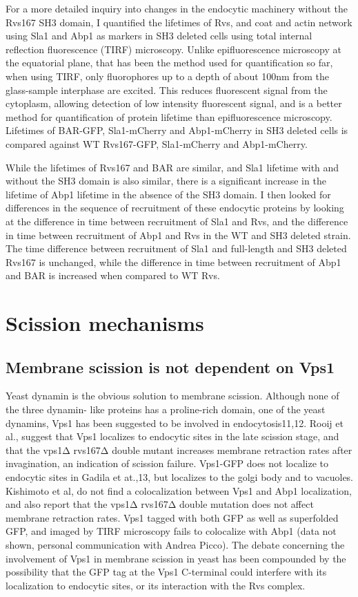 For a more detailed inquiry into changes in the endocytic machinery without the Rvs167 SH3 domain, I quantified the lifetimes of Rvs, and coat and actin network using Sla1 and Abp1 as markers in SH3 deleted cells using total internal reflection fluorescence (TIRF) microscopy. Unlike epifluorescence microscopy at the equatorial plane, that has been the method used for quantification so far, when using TIRF, only fluorophores up to a depth of about 100nm from the glass-sample interphase are excited. This reduces fluorescent signal from the cytoplasm, allowing detection of low intensity fluorescent signal, and is a better method for quantification of protein lifetime than epifluorescence microscopy. Lifetimes of BAR-GFP, Sla1-mCherry and Abp1-mCherry in SH3 deleted cells is compared against WT Rvs167-GFP, Sla1-mCherry and Abp1-mCherry. 

	
	\vspace{5mm}
While the lifetimes of Rvs167 and BAR are similar, and Sla1 lifetime with and without the SH3 domain is also similar, there is a significant increase in the lifetime of Abp1 lifetime in the absence of the SH3 domain. I then looked for differences in the sequence of recruitment of these endocytic proteins by looking at the difference in time between recruitment of Sla1 and Rvs, and the difference in time between recruitment of Abp1 and Rvs in the WT and SH3 deleted strain. The time difference between recruitment of Sla1 and full-length and SH3 deleted Rvs167 is unchanged, while the difference in time between recruitment of Abp1 and BAR is increased when compared to WT Rvs.


		
\section{Scission mechanisms}

	\subsection{Membrane scission is not dependent on Vps1}
	Yeast dynamin is the obvious solution to membrane scission. Although none of the three dynamin- like proteins has a proline-rich domain, one of the yeast dynamins, Vps1 has been suggested to be involved in endocytosis11,12. Rooij et al., suggest that Vps1 localizes to endocytic sites in the late scission stage, and that the vps1Δ rvs167Δ double mutant increases membrane retraction rates after invagination, an indication of scission failure. Vps1-GFP does not localize to endocytic sites in Gadila et at.,13, but localizes to the golgi body and to vacuoles. Kishimoto et al, do not find a colocalization between Vps1 and Abp1 localization, and also report that the vps1Δ rvs167Δ  double mutation does not affect membrane retraction rates. Vps1 tagged with both GFP as well as superfolded GFP, and imaged by TIRF microscopy fails to colocalize with Abp1 (data not shown, personal communication with Andrea Picco). The debate concerning the involvement of Vps1 in membrane scission in yeast has been compounded by the possibility that the GFP tag at the Vps1 C-terminal could interfere with its localization to endocytic sites, or its interaction with the Rvs complex. 
	
